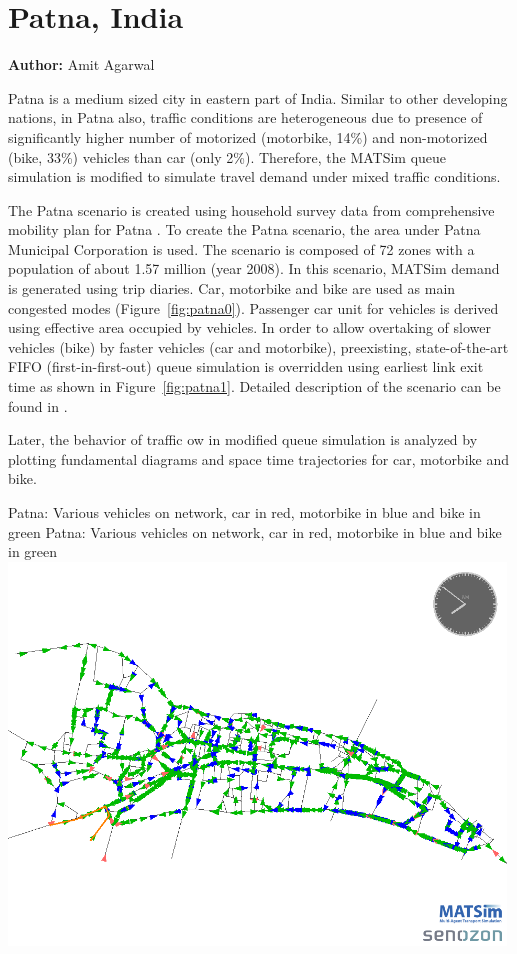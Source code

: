\section{Patna, India}
\label{ch:scenarios:patna}
\hfill \textbf{Author:} Amit Agarwal

Patna is a medium sized city in eastern part of India. Similar to other developing nations, in Patna also, traffic conditions are heterogeneous due to presence of significantly higher number of motorized (motorbike, 14\%) and non-motorized (bike, 33\%) vehicles than car (only 2\%). Therefore, the MATSim queue simulation is modified to simulate travel demand under mixed traffic conditions.

The Patna scenario is created using household survey data from comprehensive mobility plan for Patna \citep[][]{TrippItransVks2009PatnaReport}. To create the Patna scenario, the area under Patna Municipal Corporation is used. The scenario is composed of 72 zones with a population of about 1.57 million (year 2008). In this scenario, MATSim demand is generated using trip diaries. Car, motorbike and bike are used as main congested modes (Figure~\ref{fig:patna0}). Passenger car unit for vehicles is derived using effective area occupied by vehicles. In order to allow overtaking of slower vehicles (bike) by faster vehicles (car and motorbike), preexisting, state-of-the-art FIFO (first-in-first-out) queue simulation is overridden using earliest link exit time as shown in Figure~\ref{fig:patna1}. Detailed description of the scenario can be found in \citet[][]{AgarwalEtcMixedTraffic}.

Later, the behavior of traffic ow in modified queue simulation is analyzed by plotting fundamental diagrams and space time trajectories for car, motorbike and bike.

\createfigure%
{Patna: Various vehicles on network, car in red, motorbike in blue and bike in green}%
{Patna: Various vehicles on network, car in red, motorbike in blue and bike in green}%
{\label{fig:patna0}}%
{\includegraphics[width=0.99\textwidth, angle=0]{using/figures/vehiclesOnNetwork}}%
{}

